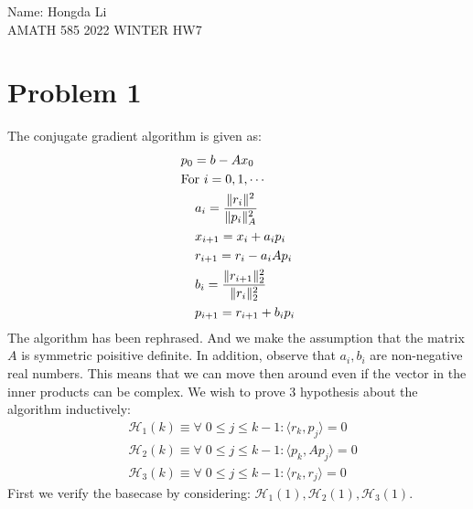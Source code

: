 \documentclass[]{article}
\begin{document}
\begin{center}
    Name: Hongda Li
    \\
    AMATH 585 2022 WINTER HW7 
\end{center}
\section*{Problem 1}
    The conjugate gradient algorithm is given as: 
    \begin{align*}
        & p_0 = b - Ax_0 
        \\&
        \text{For } i = 0,1, \cdots
        \\&\hspace{1.1em}
        \begin{aligned}
            & a_{i} = \frac{\Vert r_i\Vert^2}{\Vert p_i\Vert^2_A}
            \\
            & x_{i + 1} = x_i + a_i p_i
            \\
            & r_{i + 1} = r_i - a_iAp_i
            \\
            & b_{i} = \frac{\Vert r_{i + 1}\Vert_2^2}{\Vert r_i\Vert_2^2}
            \\
            & p_{i + 1} = r_{i + 1} + b_{i}p_i
        \end{aligned}
    \end{align*}
    The algorithm has been rephrased. And we make the assumption that the matrix $A$ is symmetric poisitive definite. In addition, observe that $a_i, b_i$ are non-negative real numbers. This means that we can move then around even if the vector in the inner products can be complex. We wish to prove 3 hypothesis about the algorithm inductively: 
    \begin{align*}\tag{1.1}\label{eqn:1.1}
        & \mathcal{H}_1(k) \equiv  \forall\; 0 \le j \le k - 1: \langle r_k, p_j\rangle = 0
        \\
        & \mathcal{H}_2(k) \equiv \forall\; 0 \le j \le k - 1: \langle p_k, Ap_j\rangle = 0
        \\
        & \mathcal{H}_3(k)\equiv \forall\; 0\le j \le k - 1: \langle  r_k, r_j\rangle = 0
    \end{align*}
    First we verify the basecase by considering: $\mathcal{H}_1(1), \mathcal{H}_2(1), \mathcal{H}_3(1)$. 
\end{document}
